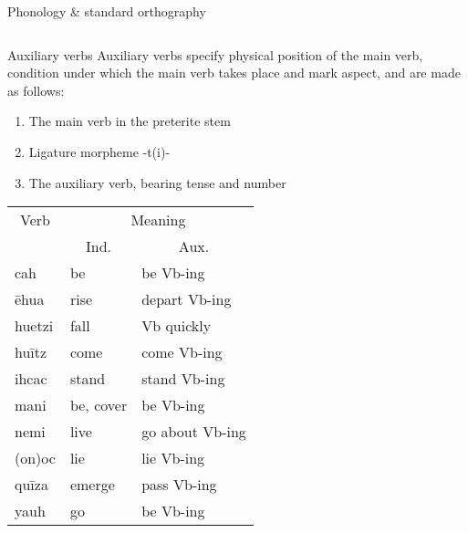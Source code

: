 \documentclass[12pt]{beamer}
\newcommand{\nah}[1]{\textcolor{nahgrn}{#1}}
\newcommand{\trs}[1]{\textcolor{nahblu}{#1}}
\begin{document}
\begin{frame}
\begin{columns}[t]
\begin{column}{.22\linewidth}
\begin{block}{Phonology \& standard orthography}
\begin{threeparttable}
\begin{tablenotes}
\begin{frame}
\begin{frame}
\begin{columns}[t]
                    \begin{column}{.18\linewidth}
                      \begin{block}{Auxiliary verbs}
                        Auxiliary verbs specify physical position of the main verb, condition under which the main verb takes place and mark aspect, and are made as follows:
                        \begin{enumerate}
                        \item The main verb in the preterite stem
                        \item Ligature morpheme \nah{-t(i)-}
                        \item The auxiliary verb, bearing tense and number
                        \end{enumerate}
                        \begin{threeparttable}
                          \begin{tabular}{lll}
                            \multicolumn{1}{c}{Verb}& \multicolumn{2}{c}{Meaning}\\
                                                    & \multicolumn{1}{c}{Ind.} & \multicolumn{1}{c}{Aux.} \\ 
                            \nah{cah}    & \trs{be}                  & \trs{be Vb-ing}         \\
                            \nah{ēhua}   & \trs{rise}        & \trs{depart   Vb-ing}   \\
                            \nah{huetzi} & \trs{fall}                & \trs{Vb   quickly}      \\
                            \nah{huītz}  & \trs{come}                & \trs{come   Vb-ing}     \\
                            \nah{ihcac}  & \trs{stand}               & \trs{stand   Vb-ing}    \\
                            \nah{mani}   & \trs{be, cover}     & \trs{be Vb-ing}         \\
                            \nah{nemi}   & \trs{live}                & \trs{go   about Vb-ing} \\
                            \nah{(on)oc} & \trs{lie}                 & \trs{lie   Vb-ing}      \\
                            \nah{quīza}  & \trs{emerge}        & \trs{pass   Vb-ing}     \\
                            \nah{yauh}\tnote{1}   & \trs{go}                  & \trs{be Vb-ing}         \\ 

\end{tabular}
\end{threeparttable}
\end{block}
\end{column}
\end{columns}
\end{frame}
\end{frame}
\end{tablenotes}
\end{threeparttable}
\end{block}
\end{column}
\end{columns}
\end{frame}
\end{document}

